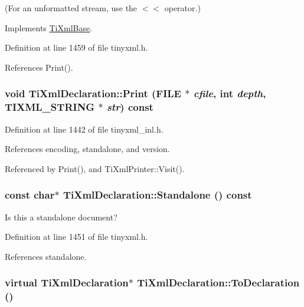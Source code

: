 (For an unformatted stream, use the $<$$<$ operator.) 

Implements \hyperlink{class_ti_xml_base_a0de56b3f2ef14c65091a3b916437b512}{TiXmlBase}.

Definition at line 1459 of file tinyxml.h.

References Print().\hypertarget{class_ti_xml_declaration_aa5ab32ec19d4eeecff4a9238c6c90565}{
\subsubsection[{Print}]{\setlength{\rightskip}{0pt plus 5cm}void TiXmlDeclaration::Print (FILE $\ast$ {\em cfile}, \/  int {\em depth}, \/  TIXML\_\-STRING $\ast$ {\em str}) const}}
\label{class_ti_xml_declaration_aa5ab32ec19d4eeecff4a9238c6c90565}


Definition at line 1442 of file tinyxml\_\-inl.h.

References encoding, standalone, and version.

Referenced by Print(), and TiXmlPrinter::Visit().\hypertarget{class_ti_xml_declaration_a9ff06afc033d7ef730ec7c6825b97ad9}{
\subsubsection[{Standalone}]{\setlength{\rightskip}{0pt plus 5cm}const char$\ast$ TiXmlDeclaration::Standalone () const}}
\label{class_ti_xml_declaration_a9ff06afc033d7ef730ec7c6825b97ad9}


Is this a standalone document? 

Definition at line 1451 of file tinyxml.h.

References standalone.\hypertarget{class_ti_xml_declaration_a6bd3d1daddcaeb9543c24bfd090969ce}{
\subsubsection[{ToDeclaration}]{\setlength{\rightskip}{0pt plus 5cm}virtual {\bf TiXmlDeclaration}$\ast$ TiXmlDeclaration::ToDeclaration ()}}
\label{class_ti_xml_declaration_a6bd3d1daddcaeb9543c24bfd090969ce}


